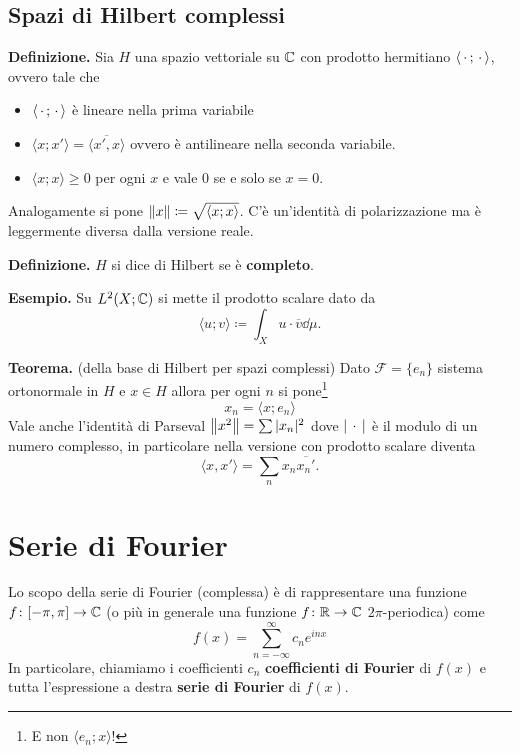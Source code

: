 %
%

\section{Spazi di Hilbert complessi}

\textbf{Definizione.}
Sia $H$ una spazio vettoriale su $\mathbb C$ con prodotto hermitiano $\langle\,\cdot\,; \,\cdot\,\rangle$, ovvero tale che
\begin{itemize}
	\item $\langle \,\cdot\,; \,\cdot\, \rangle$ è lineare nella prima variabile
	\item $\langle x; x' \rangle = \overline{\langle x', x \rangle}$ ovvero è antilineare nella seconda variabile.
	\item $\langle x; x \rangle \geq 0$ per ogni $x$ e vale $0$ se e solo se $x = 0$.
\end{itemize}

Analogamente si pone $\left\lVert x \right\rVert \coloneqq \sqrt{\langle x; x \rangle}$. C'è un'identità di polarizzazione ma è leggermente diversa dalla versione reale.

\textbf{Definizione.} $H$ si dice di Hilbert se è \textbf{completo}.

\textbf{Esempio.}
Su $L^2(X; \mathbb C)$ si mette il prodotto scalare dato da
$$
\langle u; v \rangle \coloneqq \int_X u \cdot \overline v \dd \mu.
$$

\textbf{Teorema.} (della base di Hilbert per spazi complessi)
Dato $\mathcal F = \{ e_n \}$ sistema ortonormale in $H$ e $x \in H$ allora per ogni $n$ si pone\footnote{E non $\langle e_n; x \rangle$!}
$$
x_n = \langle x; e_n \rangle
$$
Vale anche l'identità di Parseval $\left\lVert x^2 \right\rVert = \sum |x_n|^2$ dove $|\,\cdot\,|$ è il modulo di un numero complesso, in particolare nella versione con prodotto scalare diventa
$$
\langle x, x' \rangle = \sum_n x_n \overline{x_n'}.
$$


\chapter{Serie di Fourier}

Lo scopo della serie di Fourier (complessa) è di rappresentare una funzione $f \colon [-\pi, \pi] \to \mathbb C$ (o più in generale una funzione $f \colon \mathbb R \to \mathbb C$ $2\pi$-periodica) come
$$
f(x) = \sum_{n=-\infty}^\infty c_n e^{i n x}
$$
In particolare, chiamiamo i coefficienti $c_n$ \textbf{coefficienti di Fourier} di $f(x)$ e tutta l'espressione a destra \textbf{serie di Fourier} di $f(x)$.

